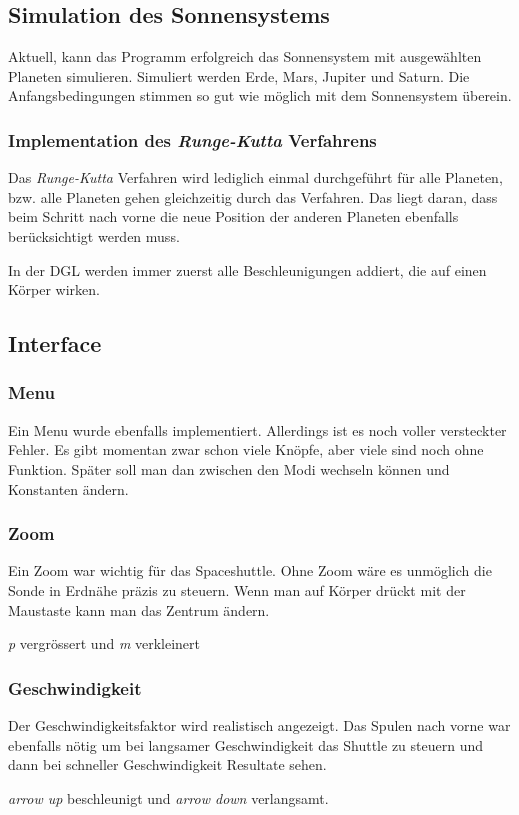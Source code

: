 \documentclass{article}
\begin{document}
\subsection{Simulation des Sonnensystems}
Aktuell, kann das Programm erfolgreich das Sonnensystem mit ausgewählten Planeten simulieren. Simuliert werden Erde, Mars, Jupiter und Saturn. Die Anfangsbedingungen stimmen so gut wie möglich mit dem Sonnensystem überein.
\subsubsection{Implementation des \textit{Runge-Kutta }Verfahrens}
Das \textit{Runge-Kutta} Verfahren wird lediglich einmal durchgeführt für alle Planeten, bzw. alle Planeten gehen gleichzeitig durch das Verfahren. Das liegt daran, dass beim Schritt nach vorne die neue Position der anderen Planeten ebenfalls berücksichtigt werden muss.

In der DGL werden immer zuerst alle Beschleunigungen addiert, die auf einen Körper wirken.
\subsection{Interface}
\subsubsection{Menu}
Ein Menu wurde ebenfalls implementiert. Allerdings ist es noch voller versteckter Fehler. Es gibt momentan zwar schon viele Knöpfe, aber viele sind noch ohne Funktion. Später soll man dan zwischen den Modi wechseln können und Konstanten ändern.
\subsubsection{Zoom}
Ein Zoom war wichtig für das Spaceshuttle. Ohne Zoom wäre es unmöglich die Sonde in Erdnähe präzis zu steuern. Wenn man auf Körper drückt mit der Maustaste kann man das Zentrum ändern.

\textit{p} vergrössert und \textit{m} verkleinert
\subsubsection{Geschwindigkeit}
Der Geschwindigkeitsfaktor wird realistisch angezeigt. Das Spulen nach vorne war ebenfalls nötig um bei langsamer Geschwindigkeit das Shuttle zu steuern und dann bei schneller Geschwindigkeit Resultate sehen.

\textit{arrow up} beschleunigt und \textit{arrow down} verlangsamt.
\end{document}
